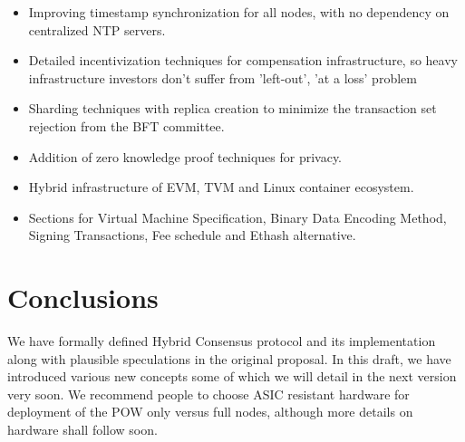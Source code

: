 \documentclass[9pt,oneside]{amsart}
\begin{document}
\begin{multicols}{2}
\begin{itemize}
  \item Improving timestamp synchronization for all nodes, with no dependency on centralized NTP servers.
  \item Detailed incentivization techniques for compensation infrastructure, so heavy infrastructure investors don't suffer from 'left-out', 'at a loss' problem
  \item Sharding techniques with replica creation to minimize the transaction set rejection from the BFT committee.
  \item Addition of zero knowledge proof techniques for privacy.
  \item Hybrid infrastructure of EVM, TVM and Linux container ecosystem.
  \item Sections for Virtual Machine Specification, Binary Data Encoding Method, Signing Transactions, Fee schedule and Ethash alternative.
\end{itemize}

\section{Conclusions}

We have formally defined Hybrid Consensus protocol and its implementation along with plausible speculations in the original
proposal. In this draft, we have introduced various new concepts some of which we will detail in the next version very soon.
We recommend people to choose ASIC resistant hardware for deployment of the POW only versus full nodes,
although more details on hardware shall follow soon.


\end{multicols}
\end{document}
